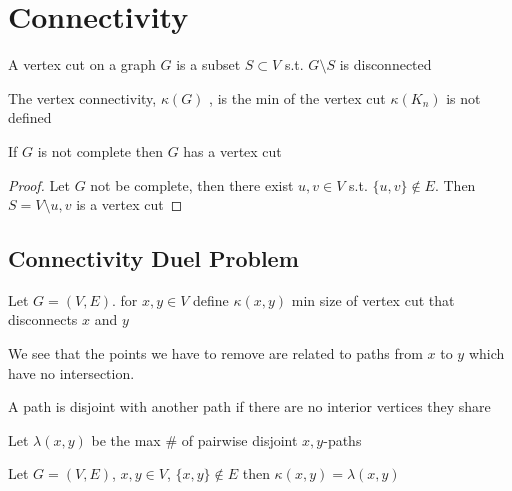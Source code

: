 
\section{Connectivity}

\begin{definition}
	\label{def:vertex cut}
	A vertex cut on a graph \(G\) is a subset \(S \subset V\) s.t. \(G \setminus S\) is disconnected
\end{definition}  

\begin{definition}
	\label{def:vertex connectivity}
	The vertex connectivity, \(\kappa (G)\) , is the min of the vertex cut
	\(\kappa (K_n)\) is not defined 
\end{definition}

\begin{lemma}
	If \(G\) is not complete then \(G\)  has a vertex cut
\end{lemma} 
\begin{proof}
	Let \(G\) not be complete, then there exist \(u, v \in V\)  s.t. \(\{u,v\} \notin E\). Then \(S = V\setminus{u, v}\) is a vertex cut
\end{proof}

\subsection{Connectivity Duel Problem}
Let \(G = (V,E)\). for \(x, y \in V\) define \(\kappa (x,y)\) min size of vertex cut that disconnects \(x\) and \(y\)

\begin{note}
	We see that the points we have to remove are related to paths from \(x\) to \(y\) which have no intersection.
\end{note} 

\begin{definition}
	\label{def:disjoint path}
	A path is disjoint with another path if there are no interior vertices they share
\end{definition}

\begin{definition}
	\label{def:max pairwise dijoint}
	Let \(\lambda (x, y)\) be the max # of pairwise disjoint \(x,y\)-paths  
\end{definition}  
\begin{theorem}[Menger]
	\label{thm:menger}
	Let \(G = (V,E)\), \(x,y \in V\), \(\{x,y\} \notin E\) then 
	\(\kappa (x,y) = \lambda (x,y)\) 
\end{theorem}

